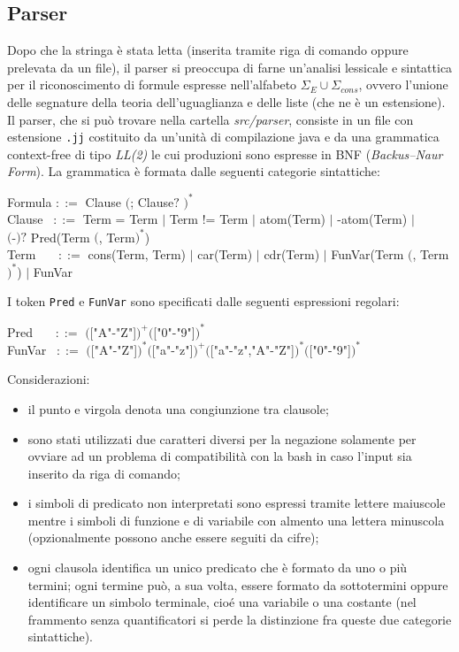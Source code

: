\documentclass[a4paper,11pt]{article}
\newcommand{\grammarindent}[1][1]{\hspace*{#1\parindent}\ignorespaces}
\begin{document}
\subsection{Parser}
Dopo che la stringa è stata letta (inserita tramite riga di comando 
oppure prelevata da un file), il parser si preoccupa di farne un'analisi 
lessicale e sintattica per il riconoscimento di formule espresse 
nell'alfabeto $\Sigma_{E}\cup\Sigma_{cons}$, ovvero l'unione delle 
segnature della teoria dell'uguaglianza e delle liste (che ne è un 
estensione).\\
Il parser, che si può trovare nella cartella \emph{src/parser}, consiste 
in un file con estensione \texttt{.jj} costituito da un'unità di 
compilazione java e da una grammatica context-free di tipo \emph{LL(2)} 
le cui produzioni sono espresse in BNF (\emph{Backus–Naur Form}).
La grammatica è formata dalle seguenti categorie sintattiche: \\[1mm]
\begin{ttfamily}
\grammarindent Formula $::=$  Clause $($; Clause$?$ $)^*$ \\
\grammarindent Clause~ $::=$ Term = Term $|$ Term != Term $|$ atom(Term) $|$ -atom(Term) $|$ \\
\grammarindent[8] $($-$)?$ Pred(Term $($, Term$)^*$)\\
\grammarindent Term~~~ $::=$ cons(Term, Term) $|$ car(Term) $|$ cdr(Term) $|$ FunVar(Term $($, Term$)^*$) $|$ FunVar \\[1mm]
\end{ttfamily}
I token \texttt{Pred} e \texttt{FunVar} sono specificati dalle 
seguenti espressioni regolari:\\[1mm]
\begin{ttfamily}
\grammarindent Pred~~~ $::=$ $($["A"-"Z"]$)^+($["0"-"9"]$)^*$\\
\grammarindent FunVar~ $::=$ $($["A"-"Z"]$)^*($["a"-"z"]$)^+($["a"-"z","A"-"Z"]$)^*($["0"-"9"]$)^*$\\[1.5mm]
\end{ttfamily}
\noindent Considerazioni:
\begin{itemize}
\item il punto e virgola denota una congiunzione tra clausole;
\item sono stati utilizzati due caratteri diversi per la negazione 
solamente per ovviare ad un problema di compatibilità con la bash in caso 
l'input sia inserito da riga di comando; 
\item i simboli di predicato non interpretati sono espressi tramite 
lettere maiuscole mentre i simboli di funzione e di variabile con almento 
una lettera minuscola (opzionalmente possono anche essere seguiti da 
cifre);
\item ogni clausola identifica un unico predicato che è formato da uno o 
più termini; ogni termine può, a sua volta, essere formato da sottotermini 
oppure identificare un simbolo terminale, cioé una variabile o una costante 
(nel frammento senza quantificatori si perde la distinzione fra queste due 
categorie sintattiche).
\end{itemize}
\end{document}
